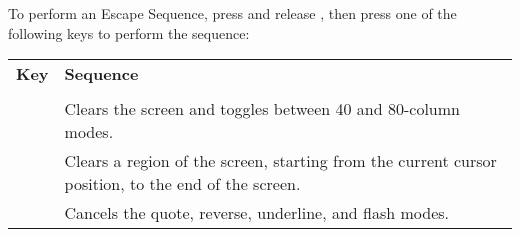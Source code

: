 To perform an Escape Sequence, press and release , then press one of the following keys to perform
the sequence:

\begin{center}
\begin{longtable}{c|L{5.5cm}}
	\textbf{Key} & \textbf{Sequence}\\
  \hhline{==}
	\endhead

   \\
  \hhline{==}
  &
Clears the screen and toggles between 40 and 80-column modes.\\
\hline
{}  &
Clears a region of the screen, starting from the current cursor position, to the end of the screen.\\
\hline
{}  &
Cancels the quote, reverse, underline, and flash modes.\\


\end{longtable}
\end{center}
